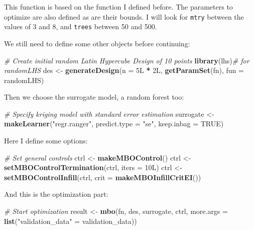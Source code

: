 \documentclass[
]{article}
\newenvironment{Shaded}{\begin{snugshade}}{\end{snugshade}}
\newcommand{\CommentTok}[1]{\textcolor[rgb]{0.56,0.35,0.01}{\textit{#1}}}
\newcommand{\DataTypeTok}[1]{\textcolor[rgb]{0.13,0.29,0.53}{#1}}
\newcommand{\KeywordTok}[1]{\textcolor[rgb]{0.13,0.29,0.53}{\textbf{#1}}}
\newcommand{\NormalTok}[1]{#1}
\newcommand{\OperatorTok}[1]{\textcolor[rgb]{0.81,0.36,0.00}{\textbf{#1}}}
\newcommand{\OtherTok}[1]{\textcolor[rgb]{0.56,0.35,0.01}{#1}}
\newcommand{\StringTok}[1]{\textcolor[rgb]{0.31,0.60,0.02}{#1}}
\begin{document}
This function is based on the function I defined before. The parameters to optimize are also
defined as are their bounds. I will look for \texttt{mtry} between the values of 3 and 8, and \texttt{trees}
between 50 and 500.

We still need to define some other objects before continuing:

\begin{Shaded}
\begin{Highlighting}[]
\CommentTok{\# Create initial random Latin Hypercube Design of 10 points}
\KeywordTok{library}\NormalTok{(lhs)}\CommentTok{\# for randomLHS}
\NormalTok{des \textless{}{-}}\StringTok{ }\KeywordTok{generateDesign}\NormalTok{(}\DataTypeTok{n =}\NormalTok{ 5L }\OperatorTok{*}\StringTok{ }\NormalTok{2L, }\KeywordTok{getParamSet}\NormalTok{(fn), }\DataTypeTok{fun =}\NormalTok{ randomLHS)}
\end{Highlighting}
\end{Shaded}

Then we choose the surrogate model, a random forest too:

\begin{Shaded}
\begin{Highlighting}[]
\CommentTok{\# Specify kriging model with standard error estimation}
\NormalTok{surrogate \textless{}{-}}\StringTok{ }\KeywordTok{makeLearner}\NormalTok{(}\StringTok{"regr.ranger"}\NormalTok{, }\DataTypeTok{predict.type =} \StringTok{"se"}\NormalTok{, }\DataTypeTok{keep.inbag =} \OtherTok{TRUE}\NormalTok{)}
\end{Highlighting}
\end{Shaded}

Here I define some options:

\begin{Shaded}
\begin{Highlighting}[]
\CommentTok{\# Set general controls}
\NormalTok{ctrl \textless{}{-}}\StringTok{ }\KeywordTok{makeMBOControl}\NormalTok{()}
\NormalTok{ctrl \textless{}{-}}\StringTok{ }\KeywordTok{setMBOControlTermination}\NormalTok{(ctrl, }\DataTypeTok{iters =}\NormalTok{ 10L)}
\NormalTok{ctrl \textless{}{-}}\StringTok{ }\KeywordTok{setMBOControlInfill}\NormalTok{(ctrl, }\DataTypeTok{crit =} \KeywordTok{makeMBOInfillCritEI}\NormalTok{())}
\end{Highlighting}
\end{Shaded}

And this is the optimization part:

\begin{Shaded}
\begin{Highlighting}[]
\CommentTok{\# Start optimization}
\NormalTok{result \textless{}{-}}\StringTok{ }\KeywordTok{mbo}\NormalTok{(fn, des, surrogate, ctrl, }\DataTypeTok{more.args =} \KeywordTok{list}\NormalTok{(}\StringTok{"validation\_data"}\NormalTok{ =}\StringTok{ }\NormalTok{validation\_data))}
\end{Highlighting}
\end{Shaded}
\end{document}
